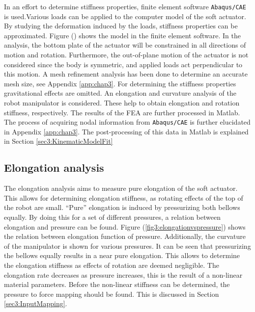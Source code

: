 In an effort to determine stiffness properties, finite element software
\verb+Abaqus/CAE+ is used.Various loads can be applied to the computer model of the soft actuator. By studying the deformation induced by the loads, stiffness properties can be approximated. Figure () shows the model in the finite element software. In the analysis, the bottom plate of the actuator will be constrained in all directions of motion and rotation. Furthermore, the out-of-plane motion of the actuator is not considered since the body is symmetric, and applied loads act perpendicular to this motion. A mesh refinement analysis has been done to determine an accurate mesh size, see Appendix \ref{app:chap3}. For determining the stiffness properties gravitational effects are omitted. An elongation and curvature analysis of the robot manipulator is considered. These help to obtain elongation and rotation stiffness, respectively. The results of the FEA are further processed in Matlab. The process of acquiring nodal information from \verb+Abaqus/CAE+ is further elucidated in Appendix \ref{app:chap3}. The post-processing of this data in Matlab is explained in Section \ref{sec3:KinematicModelFit}  



\subsection{Elongation analysis}


The elongation analysis aims to measure pure elongation of the soft actuator. This allows for determining elongation stiffness, as rotating effects of the top of the robot are small. ``Pure'' elongation is induced by pressurizing both bellows equally. By doing this for a set of different pressures, a relation between elongation and pressure can be found. Figure (\ref{fig3:elongationvspressure}) shows the relation between elongation function of pressure. Additionally, the curvature of the manipulator is shown for various pressures. It can be seen that pressurizing the bellows equally results in a near pure elongation. This allows to determine the elongation stiffness as effects of rotation are deemed negligible. The elongation rate decreases as pressure increases, this is the result of a non-linear material parameters. Before the non-linear stiffness can be determined, the pressure to force mapping should be found. This is discussed in Section \ref{sec3:InputMapping}.

